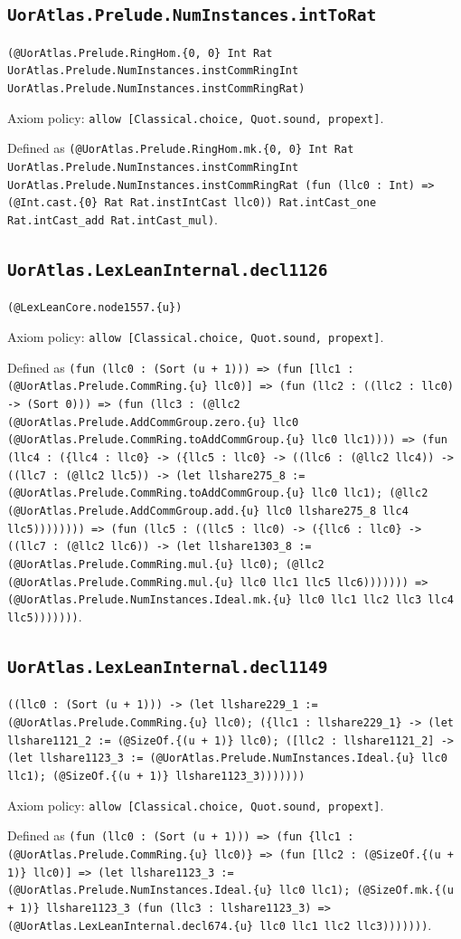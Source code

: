 \documentclass[11pt]{article}
\begin{document}
\subsection*{\texttt{UorAtlas.Prelude.NumInstances.intToRat}}
\noindent\texttt{(@UorAtlas.Prelude.RingHom.\{0, 0\} Int Rat UorAtlas.Prelude.NumInstances.instCommRingInt UorAtlas.Prelude.NumInstances.instCommRingRat)}\par
\noindent Axiom policy: \texttt{allow [Classical.choice, Quot.sound, propext]}.\par
\noindent Defined as \texttt{(@UorAtlas.Prelude.RingHom.mk.\{0, 0\} Int Rat UorAtlas.Prelude.NumInstances.instCommRingInt UorAtlas.Prelude.NumInstances.instCommRingRat (fun (llc0 : Int) => (@Int.cast.\{0\} Rat Rat.instIntCast llc0)) Rat.intCast\_one Rat.intCast\_add Rat.intCast\_mul)}.\par
\subsection*{\texttt{UorAtlas.LexLeanInternal.decl1126}}
\noindent\texttt{(@LexLeanCore.node1557.\{u\})}\par
\noindent Axiom policy: \texttt{allow [Classical.choice, Quot.sound, propext]}.\par
\noindent Defined as \texttt{(fun (llc0 : (Sort (u + 1))) => (fun [llc1 : (@UorAtlas.Prelude.CommRing.\{u\} llc0)] => (fun (llc2 : ((llc2 : llc0) -> (Sort 0))) => (fun (llc3 : (@llc2 (@UorAtlas.Prelude.AddCommGroup.zero.\{u\} llc0 (@UorAtlas.Prelude.CommRing.toAddCommGroup.\{u\} llc0 llc1)))) => (fun (llc4 : (\{llc4 : llc0\} -> (\{llc5 : llc0\} -> ((llc6 : (@llc2 llc4)) -> ((llc7 : (@llc2 llc5)) -> (let llshare275\_8 := (@UorAtlas.Prelude.CommRing.toAddCommGroup.\{u\} llc0 llc1); (@llc2 (@UorAtlas.Prelude.AddCommGroup.add.\{u\} llc0 llshare275\_8 llc4 llc5)))))))) => (fun (llc5 : ((llc5 : llc0) -> (\{llc6 : llc0\} -> ((llc7 : (@llc2 llc6)) -> (let llshare1303\_8 := (@UorAtlas.Prelude.CommRing.mul.\{u\} llc0); (@llc2 (@UorAtlas.Prelude.CommRing.mul.\{u\} llc0 llc1 llc5 llc6))))))) => (@UorAtlas.Prelude.NumInstances.Ideal.mk.\{u\} llc0 llc1 llc2 llc3 llc4 llc5)))))))}.\par
\subsection*{\texttt{UorAtlas.LexLeanInternal.decl1149}}
\noindent\texttt{((llc0 : (Sort (u + 1))) -> (let llshare229\_1 := (@UorAtlas.Prelude.CommRing.\{u\} llc0); (\{llc1 : llshare229\_1\} -> (let llshare1121\_2 := (@SizeOf.\{(u + 1)\} llc0); ([llc2 : llshare1121\_2] -> (let llshare1123\_3 := (@UorAtlas.Prelude.NumInstances.Ideal.\{u\} llc0 llc1); (@SizeOf.\{(u + 1)\} llshare1123\_3)))))))}\par
\noindent Axiom policy: \texttt{allow [Classical.choice, Quot.sound, propext]}.\par
\noindent Defined as \texttt{(fun (llc0 : (Sort (u + 1))) => (fun \{llc1 : (@UorAtlas.Prelude.CommRing.\{u\} llc0)\} => (fun [llc2 : (@SizeOf.\{(u + 1)\} llc0)] => (let llshare1123\_3 := (@UorAtlas.Prelude.NumInstances.Ideal.\{u\} llc0 llc1); (@SizeOf.mk.\{(u + 1)\} llshare1123\_3 (fun (llc3 : llshare1123\_3) => (@UorAtlas.LexLeanInternal.decl674.\{u\} llc0 llc1 llc2 llc3)))))))}.\par
\end{document}
